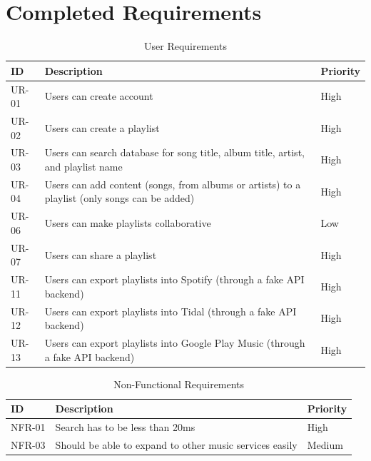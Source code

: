 \documentclass[12pt]{article}
\begin{document}
	\section{Completed Requirements}
	\begin{table}[H]
		\centering
		\label{tab:urc}
		\caption*{User Requirements}
		\begin{tabularx}{450pt}{lXl}
			ID & Description & Priority\\\hline
			UR-01 & Users can create account & High \\
			UR-02 & Users can create a playlist & High \\
			UR-03 & Users can search database for song title, album title,
			artist, and playlist name & High \\
			UR-04 & Users can add content (songs, from albums or artists) to a playlist (only songs can be added) & High \\
			UR-06 & Users can make playlists collaborative & Low \\
			UR-07 & Users can share a playlist & High \\
			UR-11 & Users can export playlists into Spotify (through a fake API backend) & High \\
			UR-12 & Users can export playlists into Tidal (through a fake API backend) & High \\
			UR-13 & Users can export playlists into Google Play Music (through a fake API backend) & High \\
		\end{tabularx}
	\end{table}
	\begin{table}[H]
		\centering
		\label{tab:nfrc}
		\caption*{Non-Functional Requirements}
		\begin{tabularx}{450pt}{lXl}
			ID & Description & Priority\\\hline
			NFR-01 & Search has to be less than 20ms & High \\
			NFR-03 & Should be able to expand to other music services easily & Medium \\
		\end{tabularx}
	\end{table}
\end{document}
